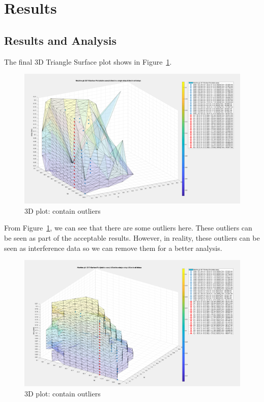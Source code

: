 \section{Results} %
\subsection{Results and Analysis} %
The final 3D Triangle Surface plot shows in Figure~\ref{5_4_1_Outlier}. 

\begin{figure}[htbp]
\centering
\includegraphics[width = .819\textwidth]{figure/5_4_1_Outlier.png}
\caption{3D plot: contain outliers}
\label{5_4_1_Outlier}
\end{figure}

From Figure~\ref{5_4_1_Outlier}, we can see that there are some outliers here. These outliers can be seen as part of the acceptable results. However, in reality, these outliers can be seen as interference data so we can remove them for a better analysis. 

\begin{figure}[htbp]
\centering
\includegraphics[width = .819\textwidth]{figure/5_4_1_without_Outlier1.png}
\caption{3D plot: contain outliers}
\label{5_4_1_without_Outlier1}
\end{figure}

